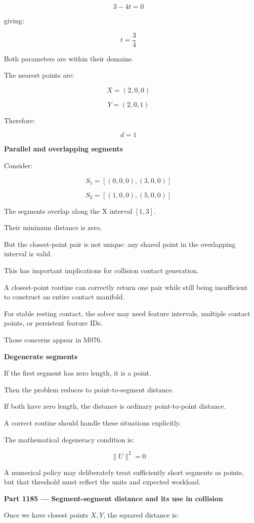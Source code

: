 \[
3-4t=0
\]

giving:

\[
t=\frac34
\]

Both parameters are within their domains.

The nearest points are:

\[
X=(2,0,0)
\]

\[
Y=(2,0,1)
\]

Therefore:

\[
\boxed{d=1}
\]

\textbf{Parallel and overlapping segments}

Consider:

\[
S_1=[(0,0,0),(3,0,0)]
\]

\[
S_2=[(1,0,0),(5,0,0)]
\]

The segments overlap along the X interval \([1,3]\).

Their minimum distance is zero.

But the closest-point pair is not unique: any shared point in the overlapping interval is valid.

This has important implications for collision contact generation.

A closest-point routine can correctly return one pair while still being insufficient to construct an entire contact manifold.

For stable resting contact, the solver may need feature intervals, multiple contact points, or persistent feature IDs.

Those concerns appear in M076.

\textbf{Degenerate segments}

If the first segment has zero length, it is a point.

Then the problem reduces to point-to-segment distance.

If both have zero length, the distance is ordinary point-to-point distance.

A correct routine should handle these situations explicitly.

The mathematical degeneracy condition is:

\[
\|U\|^2=0
\]

A numerical policy may deliberately treat sufficiently short segments as points, but that threshold must reflect the units and expected workload.

\textbf{Part 1185 --- Segment-segment distance and its use in collision}

Once we have closest points \(X,Y\), the squared distance is:

